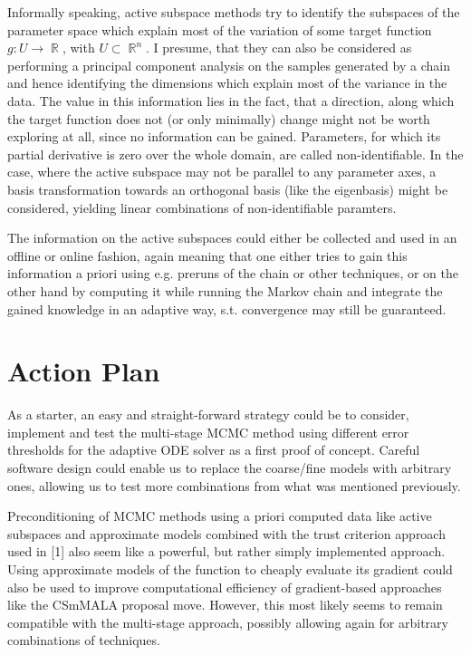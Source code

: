 \documentclass[10pt]{article}
\DeclareMathOperator\Reals{\mathbb{R}}
\begin{document}
Informally speaking, active subspace methods try to identify the subspaces of the parameter space which explain 
most of the variation of some target function $g: U \to \Reals$, with $U \subset \Reals^n$. 
I presume, that they can also be considered as performing a principal component analysis on the samples generated 
by a chain and hence identifying the dimensions which explain most of the variance in the data.
The value in this information lies in the fact, that a direction, along which the target function does not (or only
minimally) change might not be worth exploring at all, since no information can be gained.
Parameters, for which its partial derivative is zero over the whole domain, are called non-identifiable.
In the case, where the active subspace may not be parallel to any parameter axes, a basis transformation towards
an orthogonal basis (like the eigenbasis) might be considered, yielding linear combinations of non-identifiable 
paramters.

The information on the active subspaces could either be collected and used in an offline or online fashion, again meaning
that one either tries to gain this information a priori using e.g. preruns of the chain or other techniques, 
or on the other hand by computing it while running the Markov chain and integrate the gained knowledge in an adaptive way,
s.t. convergence may still be guaranteed.



\section{Action Plan}

As a starter, an easy and straight-forward strategy could be to consider, implement and test the multi-stage MCMC method
using different error thresholds for the adaptive ODE solver as a first proof of concept. 
Careful software design could enable us to replace the coarse/fine models with arbitrary ones, allowing us to test
more combinations from what was mentioned previously.

Preconditioning of MCMC methods using a priori computed data like active subspaces and approximate models combined with
the trust criterion approach used in [1] also seem like a powerful, but rather simply implemented approach. 
Using approximate models of the function to cheaply evaluate its gradient could also be used to improve computational
efficiency of gradient-based approaches like the CSmMALA proposal move.
However, this most likely seems to remain compatible with the multi-stage approach, possibly allowing again for arbitrary 
combinations of techniques.
\end{document}
